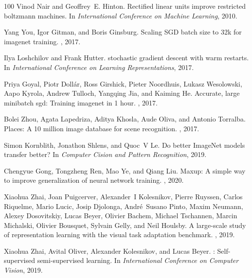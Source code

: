 \documentclass{article}
\begin{document}
{\begin{thebibliography}{100}
Vinod Nair and Geoffrey~E. Hinton.
\newblock Rectified linear units improve restricted boltzmann machines.
\newblock In {\em International Conference on Machine Learning}, 2010.

Yang You, Igor Gitman, and Boris Ginsburg.
\newblock Scaling {SGD} batch size to 32k for imagenet training.
, 2017.

Ilya Loshchilov and Frank Hutter.
 stochastic gradient descent with warm restarts.
\newblock In {\em International Conference on Learning Representations}, 2017.

Priya Goyal, Piotr Doll{\'a}r, Ross Girshick, Pieter Noordhuis, Lukasz
  Wesolowski, Aapo Kyrola, Andrew Tulloch, Yangqing Jia, and Kaiming He.
\newblock Accurate, large minibatch sgd: Training imagenet in 1 hour.
, 2017.

Bolei Zhou, Agata Lapedriza, Aditya Khosla, Aude Oliva, and Antonio Torralba.
\newblock Places: A 10 million image database for scene recognition.
,
  2017.

Simon Kornblith, Jonathon Shlens, and Quoc~V Le.
\newblock Do better {I}mage{N}et models transfer better?
\newblock In {\em Computer Cision and Pattern Recognition}, 2019.

Chengyue Gong, Tongzheng Ren, Mao Ye, and Qiang Liu.
\newblock Maxup: A simple way to improve generalization of neural network
  training.
, 2020.

Xiaohua Zhai, Joan Puigcerver, Alexander~I Kolesnikov, Pierre Ruyssen, Carlos
  Riquelme, Mario Lucic, Josip Djolonga, Andr{\'e}~Susano Pinto, Maxim Neumann,
  Alexey Dosovitskiy, Lucas Beyer, Olivier Bachem, Michael Tschannen, Marcin
  Michalski, Olivier Bousquet, Sylvain Gelly, and Neil Houlsby.
\newblock A large-scale study of representation learning with the visual task
  adaptation benchmark.
, 2019.

Xiaohua Zhai, Avital Oliver, Alexander Kolesnikov, and Lucas Beyer.
: Self-supervised semi-supervised learning.
\newblock In {\em International Conference on Computer Vision}, 2019.


\end{thebibliography}}
\end{document}
